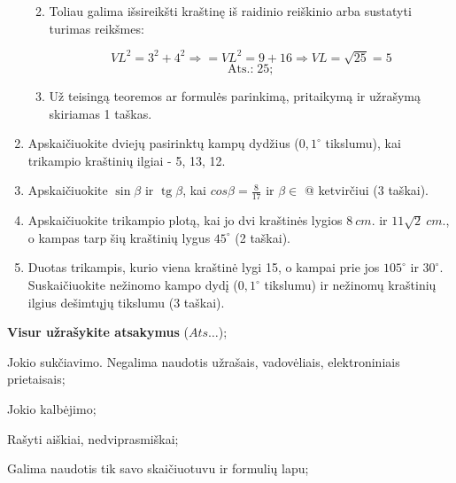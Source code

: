 \documentclass[a4paper]{article}
\makeatletter
\DeclareMathOperator{\tg}{tg}
\newcommand*{\rom}[1]{\expandafter\@slowromancap\romannumeral #1@}
\makeatother
\begin{document}
\begin{enumerate}
\begin{enumerate}
\begin{minipage}{0.5\textwidth}
                        \end{minipage}

                  \item \parbox{0.7\textwidth}{
                              Toliau galima išsireikšti kraštinę iš
                              raidinio reiškinio arba sustatyti turimas
                              reikšmes:
                        }

                        $$VL^{2}=3^{2}+4^{2} \Rightarrow=
                              VL^{2}=9+16 \Rightarrow VL=\sqrt{25}=5$$
                        $$\text{Ats.:} \; 25;$$

                  \item Už teisingą teoremos ar formulės parinkimą,
                        pritaikymą
                        ir užrašymą skiriamas 1 taškas.
            \end{enumerate}

      \item Apskaičiuokite dviejų pasirinktų kampų dydžius ($0,1^\circ$
            tikslumu), kai trikampio kraštinių ilgiai - 5, 13, 12.

      \item Apskaičiuokite $\sin\beta$ ir $\tg \beta$, kai $cos \beta =
                  \frac{8}{17}$ ir $\beta \in$ \rom{4} ketvirčiui (3 taškai).

      \item Apskaičiuokite trikampio plotą, kai jo dvi kraštinės lygios
            $8\:cm.$ ir $11\sqrt{2}\:cm.$, o kampas tarp šių kraštinių lygus
            $45^\circ$ (2 taškai).

      \item Duotas trikampis, kurio viena kraštinė lygi 15, o kampai prie jos
            $105^\circ$ ir $30^\circ$. Suskaičiuokite nežinomo kampo dydį
            ($0,1^\circ$ tikslumu) ir
            nežinomų kraštinių ilgius dešimtųjų tikslumu (3 taškai).

\end{enumerate}

\begin{small}
      \begin{enumerate*}[label={(\arabic*)}]
            \item \textbf{Visur užrašykite atsakymus} ($Ats\ldots$);
            \item Jokio sukčiavimo. Negalima naudotis užrašais, vadovėliais,
            elektroniniais prietaisais;
            \item Jokio kalbėjimo;
            \item Rašyti aiškiai, nedviprasmiškai;
            \item Galima naudotis tik savo skaičiuotuvu ir formulių lapu;
      \end{enumerate*}
\end{small}
\end{document}
